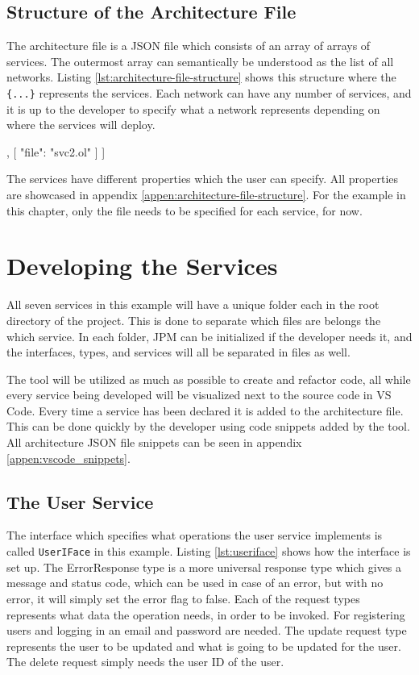 \subsection{Structure of the Architecture File}
The architecture file is a JSON file which consists of an array of arrays of services. The outermost array can semantically be understood as the list of all networks.
Listing \ref*{lst:architecture-file-structure} shows this structure where the \texttt{\{...\}} represents the services. Each network can have any number of services, and it is up to the
developer to specify what a network represents depending on where the services will deploy.

\begin{jsonlisting}[][caption={Structure of the architecture JSON file showing two networks.}, label=lst:architecture-file-structure]
[
    [
        { "file": "svc1.ol" }
    ],
    [
        { "file": "svc2.ol" }
    ]
]
\end{jsonlisting}

The services have different properties which the user can specify. All properties are showcased in appendix \ref*{appen:architecture-file-structure}.
For the example in this chapter, only the file needs to be specified for each service, for now.

\section{Developing the Services}
All seven services in this example will have a unique folder each in the root directory of the project. This is done to separate which files are belongs the which service.
In each folder, JPM can be initialized if the developer needs it, and the interfaces, types, and services will all be separated in files as well.

The tool will be utilized as much as possible to create and refactor code, all while every service being developed will be visualized next to the source code in VS Code.
Every time a service has been declared it is added to the architecture file. This can be done quickly by the developer using code snippets added by the tool. All architecture JSON file snippets can be seen in appendix \ref*{appen:vscode_snippets}.
\subsection{The User Service}
The interface which specifies what operations the user service implements is called \texttt{UserIFace} in this example.
Listing \ref*{lst:useriface} shows how the interface is set up. The ErrorResponse type is a more universal response type which gives a message and status code, which can be used in case of an error, but with no error, it will simply set the error flag to false.
Each of the request types represents what data the operation needs, in order to be invoked. For registering users and logging in an email and password are needed. The update request type represents the user to be updated and what is going to be updated for the user. The delete request simply needs the user ID of the user.

